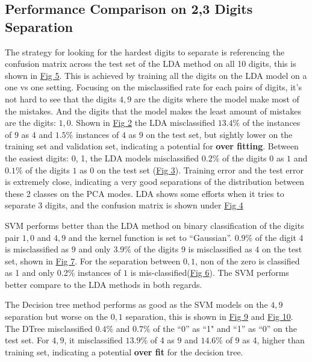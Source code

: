 \documentclass{article}
\begin{document}
    \subsection{Performance Comparison on 2,3 Digits Separation}
        \hspace{1.1em}
        The strategy for looking for the hardest digits to separate is referencing the confusion matrix across the test set of the LDA method on all 10 digits, this is shown in \hyperref[fig:figure5]{Fig 5}. This is achieved by training all the digits on the LDA model on a one vs one setting. Focusing on the misclassified rate for each pairs of digits, it's not hard to see that the digits $4, 9$ are the digits where the model make most of the mistakes. And the digits that the model makes the least amount of mistakes are the digits: $1, 0$. Shown in \hyperref[fig:figure2]{Fig 2} the LDA misclassified $13.4\%$ of the instances of $9$ as $4$ and $1.5\%$ instances of $4$ as $9$ on the test set, but sightly lower on the training set and validation set, indicating a potential for \textbf{over fitting}. Between the easiest digits: 0, 1, the LDA models misclassified $0.2\%$ of the digits $0$ as $1$ and $0.1\%$ of the digits $1$ as $0$ on the test set (\hyperref[fig:figure3]{Fig 3}). Training error and the test error is extremely close, indicating a very good separations of the distribution between these 2 classes on the PCA modes. LDA shows some efforts when it tries to separate 3 digits, and the confusion matrix is shown under \hyperref[fig:figure4]{Fig 4}
        \par
        SVM performs better than the LDA method on binary classification of the digits pair $1, 0$ and $4, 9$ and the kernel function is set to ``Gaussian''. 0.9\% of the digit 4 is misclassified as $9$ and only 3.9\% of the digits 9 is misclassified as $4$ on the test set, shown in \hyperref[fig:figure7]{Fig 7}. For the separation between $0, 1$, non of the zero is classified as 1 and only 0.2\% instances of $1$ is mis-classified(\hyperref[fig:figure6]{Fig 6}). The SVM performs better compare to the LDA methods in both regards.
        \par
        The Decision tree method performs as good as the SVM models on the $4, 9$ separation but worse on the $0, 1$ separation, this is shown in \hyperref[fig:figure9]{Fig 9} and \hyperref[fig:figure10]{Fig 10}. The DTree misclassified $0.4\%$ and $0.7\%$ of the ``0'' as ``1" and ``1'' as ``0'' on the test set. For $4, 9$, it misclassified $13.9\%$ of 4 as 9 and $14.6\%$ of 9 as 4, higher than training set, indicating a potential \textbf{over fit} for the decision tree. 
\end{document}
